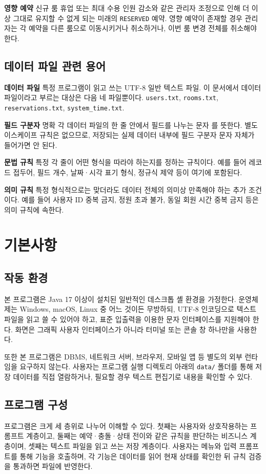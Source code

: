 \documentclass[a4paper,10pt]{article}
\newcommand{\softsep}{\textbar}
\begin{document}
\textbf{영향 예약} 신규 룸 휴업 또는 최대 수용 인원 감소와 같은 관리자 조정으로 인해 더 이상 그대로 유지할 수 없게 되는 미래의 \texttt{RESERVED} 예약. 영향 예약이 존재할 경우 관리자는 각 예약을 다른 룸으로 이동시키거나 취소하거나, 이번 룸 변경 전체를 취소해야 한다.

\subsection{데이터 파일 관련 용어}
\textbf{데이터 파일} 특정 프로그램이 읽고 쓰는 UTF-8 일반 텍스트 파일. 이 문서에서 데이터 파일이라고 부르는 대상은 다음 네 파일뿐이다. \texttt{users.txt}, \texttt{rooms.txt}, \texttt{reservations.txt}, \texttt{system\_time.txt}.

\textbf{필드 구분자} 명확 각 데이터 파일의 한 줄 안에서 필드를 나누는 문자 \softsep{}를 뜻한다. 별도 이스케이프 규칙은 없으므로, 저장되는 실제 데이터 내부에 필드 구분자 문자 자체가 들어가면 안 된다.

\textbf{문법 규칙} 특정 각 줄이 어떤 형식을 따라야 하는지를 정하는 규칙이다. 예를 들어 레코드 접두어, 필드 개수, 날짜·시각 표기 형식, 정규식 제약 등이 여기에 포함된다.

\textbf{의미 규칙} 특정 형식적으로는 맞더라도 데이터 전체의 의미상 만족해야 하는 추가 조건이다. 예를 들어 사용자 ID 중복 금지, 정원 초과 불가, 동일 회원 시간 중복 금지 등은 의미 규칙에 속한다.

\section{기본사항}

\subsection{작동 환경}
본 프로그램은 Java 17 이상이 설치된 일반적인 데스크톱 셸 환경을 가정한다. 운영체제는 Windows, macOS, Linux 중 어느 것이든 무방하되, UTF-8 인코딩으로 텍스트 파일을 읽고 쓸 수 있어야 하고, 표준 입출력을 이용한 문자 인터페이스를 지원해야 한다. 화면은 그래픽 사용자 인터페이스가 아니라 터미널 또는 콘솔 창 하나만을 사용한다.

또한 본 프로그램은 DBMS, 네트워크 서버, 브라우저, 모바일 앱 등 별도의 외부 런타임을 요구하지 않는다. 사용자는 프로그램 실행 디렉토리 아래의 \texttt{data/} 폴더를 통해 저장 데이터를 직접 열람하거나, 필요할 경우 텍스트 편집기로 내용을 확인할 수 있다.

\subsection{프로그램 구성}
프로그램은 크게 세 층위로 나누어 이해할 수 있다. 첫째는 사용자와 상호작용하는 프롬프트 계층이고, 둘째는 예약·충돌·상태 전이와 같은 규칙을 판단하는 비즈니스 계층이며, 셋째는 텍스트 파일을 읽고 쓰는 저장 계층이다. 사용자는 메뉴와 입력 프롬프트를 통해 기능을 호출하며, 각 기능은 데이터를 읽어 현재 상태를 확인한 뒤 규칙 검증을 통과하면 파일에 반영한다.
\end{document}

